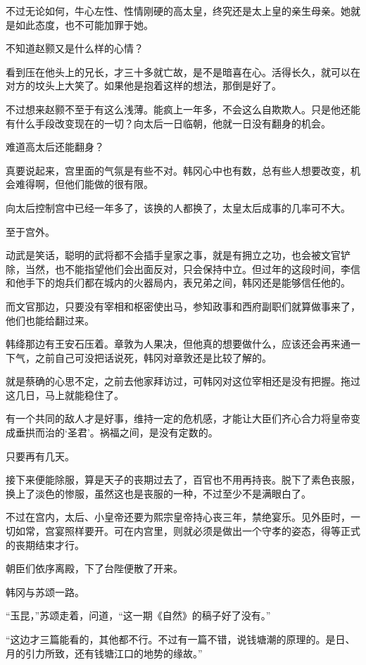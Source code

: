 不过无论如何，牛心左性、性情刚硬的高太皇，终究还是太上皇的亲生母亲。她就是如此态度，也不可能加罪于她。

不知道赵颢又是什么样的心情？

看到压在他头上的兄长，才三十多就亡故，是不是暗喜在心。活得长久，就可以在对方的坟头上大笑了。如果他是抱着这样的想法，那倒是好了。

不过想来赵颢不至于有这么浅薄。能疯上一年多，不会这么自欺欺人。只是他还能有什么手段改变现在的一切？向太后一日临朝，他就一日没有翻身的机会。

难道高太后还能翻身？

真要说起来，宫里面的气氛是有些不对。韩冈心中也有数，总有些人想要改变，机会难得啊，但他们能做的很有限。

向太后控制宫中已经一年多了，该换的人都换了，太皇太后成事的几率可不大。

至于宫外。

动武是笑话，聪明的武将都不会插手皇家之事，就是有拥立之功，也会被文官铲除，当然，也不能指望他们会出面反对，只会保持中立。但过年的这段时间，李信和他手下的炮兵们都在城内的火器局内，表兄弟之间，韩冈还是能够信任他的。

而文官那边，只要没有宰相和枢密使出马，参知政事和西府副职们就算做事来了，他们也能给翻过来。

韩绛那边有王安石压着。章敦为人果决，但他真的想要做什么，应该还会再来通一下气，之前自己可没把话说死，韩冈对章敦还是比较了解的。

就是蔡确的心思不定，之前去他家拜访过，可韩冈对这位宰相还是没有把握。拖过这几日，马上就能稳住了。

有一个共同的敌人才是好事，维持一定的危机感，才能让大臣们齐心合力将皇帝变成垂拱而治的‘圣君’。祸福之间，是没有定数的。

只要再有几天。

接下来便能除服，算是天子的丧期过去了，百官也不用再持丧。脱下了素色丧服，换上了淡色的惨服，虽然这也是丧服的一种，不过至少不是满眼白了。

不过在宫内，太后、小皇帝还要为熙宗皇帝持心丧三年，禁绝宴乐。见外臣时，一切如常，宫宴照样要开。可在内宫里，则就必须是做出一个守孝的姿态，得等正式的丧期结束才行。

朝臣们依序离殿，下了台陛便散了开来。

韩冈与苏颂一路。

“玉昆，”苏颂走着，问道，“这一期《自然》的稿子好了没有。”

“这边才三篇能看的，其他都不行。不过有一篇不错，说钱塘潮的原理的。是日、月的引力所致，还有钱塘江口的地势的缘故。”

